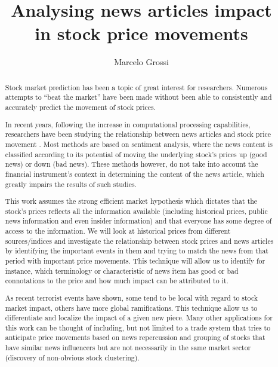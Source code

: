 \documentclass{article}
\title{Analysing news articles impact \\ in stock price movements}
\author{Marcelo Grossi}
\begin{document}
\maketitle
\begin{abstract}
Stock market prediction has been a topic of great interest for researchers. Numerous attempts to ``beat the market'' have been made without been able to consistently and accurately predict the movement of stock prices.
\par
In recent years, following the increase in computational processing capabilities, researchers have been studying the relationship between news articles and stock price movement \citep{Fu2008}\citep{Schumaker2009}. Most methods are based on sentiment analysis, where the news content is classified according to its potential of moving the underlying stock’s prices up (good news) or down (bad news). These methods however, do not take into account the financial instrument's context in determining the content of the news article, which greatly impairs the results of such studies.
\par
This work assumes the strong efficient market hypothesis which dictates that the stock's prices reflects all the information available (including historical prices, public news information and even insider information) \citep{fama1965behavior} and that everyone has some degree of access to the information. We will look at historical prices from different sources/indices and investigate the relationship between stock prices and news articles by identifying the important events in them and trying to match the news from that period with important price movements. This technique will allow us to identify for instance, which terminology or characteristic of news item has good or bad connotations to the price and how much impact can be attributed to it.
\par
As recent terrorist events have shown, some tend to be local with regard to stock market impact, others have more global ramifications.  This technique allow us to differentiate and localize the impact of a given new piece. Many other applications for this work can be thought of including, but not limited to a trade system that tries to anticipate price movements based on news repercussion and grouping of stocks that have similar news influencers but are not necessarily in the same market sector (discovery of non-obvious stock clustering).
\end{abstract}
\end{document}
